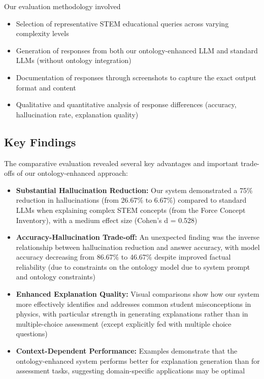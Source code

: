Our evaluation methodology involved

\begin{itemize}
    \item Selection of representative STEM educational queries across varying complexity levels
    \item Generation of responses from both our ontology-enhanced LLM and standard LLMs (without ontology integration)
    \item Documentation of responses through screenshots to capture the exact output format and content
    \item Qualitative and quantitative analysis of response differences (accuracy, hallucination rate, explanation quality)
\end{itemize}

\subsection{Key Findings}
\label{subsec:key-findings}

The comparative evaluation revealed several key advantages and important trade-offs of our ontology-enhanced approach:

\begin{itemize}
    \item \textbf{Substantial Hallucination Reduction:} Our system demonstrated a 75\% reduction in hallucinations (from 26.67\% to 6.67\%) compared to standard LLMs when explaining complex STEM concepts (from the Force Concept Inventory), with a medium effect size (Cohen's d = 0.528)
    
    \item \textbf{Accuracy-Hallucination Trade-off:} An unexpected finding was the inverse relationship between hallucination reduction and answer accuracy, with model accuracy decreasing from 86.67\% to 46.67\% despite improved factual reliability (due to constraints on the ontology model due to system prompt and ontology constraints)
    
    \item \textbf{Enhanced Explanation Quality:} Visual comparisons show how our system more effectively identifies and addresses common student misconceptions in physics, with particular strength in generating explanations rather than in multiple-choice assessment (except explicitly fed with multiple choice questions)
    
    \item \textbf{Context-Dependent Performance:} Examples demonstrate that the ontology-enhanced system performs better for explanation generation than for assessment tasks, suggesting domain-specific applications may be optimal
\end{itemize}



